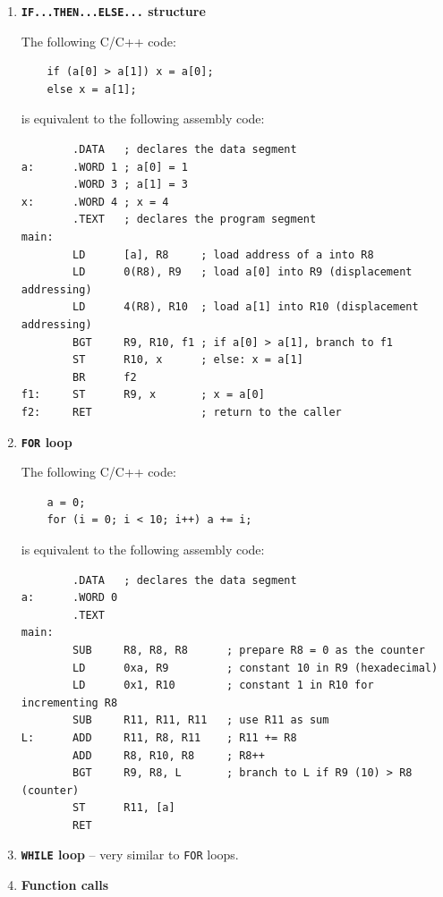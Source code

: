 \begin{enumerate}

\item {\bfseries \texttt{IF...THEN...ELSE...} structure}
\begin{example}
    The following C/C++ code:
    \begin{verbatim}
    if (a[0] > a[1]) x = a[0];
    else x = a[1];
    \end{verbatim}
    is equivalent to the following assembly code:
\begin{verbatim}
        .DATA   ; declares the data segment
a:      .WORD 1 ; a[0] = 1
        .WORD 3 ; a[1] = 3
x:      .WORD 4 ; x = 4
        .TEXT   ; declares the program segment
main:
        LD      [a], R8     ; load address of a into R8
        LD      0(R8), R9   ; load a[0] into R9 (displacement addressing)
        LD      4(R8), R10  ; load a[1] into R10 (displacement addressing)
        BGT     R9, R10, f1 ; if a[0] > a[1], branch to f1
        ST      R10, x      ; else: x = a[1]
        BR      f2
f1:     ST      R9, x       ; x = a[0]
f2:     RET                 ; return to the caller
\end{verbatim}
\end{example}

\item {\bfseries \texttt{FOR} loop}
\begin{example}
    The following C/C++ code:
    \begin{verbatim}
    a = 0;
    for (i = 0; i < 10; i++) a += i;
    \end{verbatim}
    is equivalent to the following assembly code:
\begin{verbatim}
        .DATA   ; declares the data segment
a:      .WORD 0
        .TEXT
main:
        SUB     R8, R8, R8      ; prepare R8 = 0 as the counter
        LD      0xa, R9         ; constant 10 in R9 (hexadecimal)
        LD      0x1, R10        ; constant 1 in R10 for incrementing R8
        SUB     R11, R11, R11   ; use R11 as sum
L:      ADD     R11, R8, R11    ; R11 += R8
        ADD     R8, R10, R8     ; R8++
        BGT     R9, R8, L       ; branch to L if R9 (10) > R8 (counter)
        ST      R11, [a]
        RET
\end{verbatim}
\end{example}

\item {\bfseries \texttt{WHILE} loop} -- very similar to \texttt{FOR} loops.
\item {\bfseries Function calls}


\end{enumerate}
